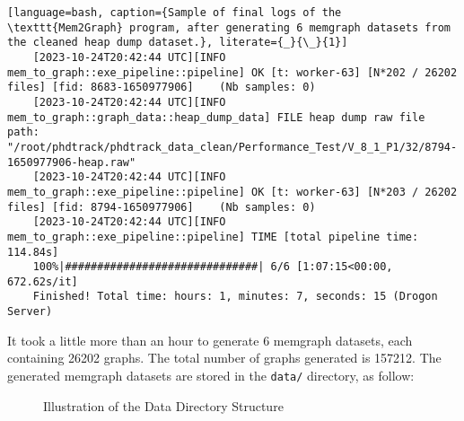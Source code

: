 \begin{lstlisting}[language=bash, caption={Sample of final logs of the \texttt{Mem2Graph} program, after generating 6 memgraph datasets from the cleaned heap dump dataset.}, literate={_}{\_}{1}]
    [2023-10-24T20:42:44 UTC][INFO mem_to_graph::exe_pipeline::pipeline] OK [t: worker-63] [N*202 / 26202 files] [fid: 8683-1650977906]    (Nb samples: 0)
    [2023-10-24T20:42:44 UTC][INFO mem_to_graph::graph_data::heap_dump_data] FILE heap dump raw file path: "/root/phdtrack/phdtrack_data_clean/Performance_Test/V_8_1_P1/32/8794-1650977906-heap.raw"
    [2023-10-24T20:42:44 UTC][INFO mem_to_graph::exe_pipeline::pipeline] OK [t: worker-63] [N*203 / 26202 files] [fid: 8794-1650977906]    (Nb samples: 0)
    [2023-10-24T20:42:44 UTC][INFO mem_to_graph::exe_pipeline::pipeline] TIME [total pipeline time: 114.84s]
    100%|##############################| 6/6 [1:07:15<00:00, 672.62s/it]
    Finished! Total time: hours: 1, minutes: 7, seconds: 15 (Drogon Server)
\end{lstlisting}

It took a little more than an hour to generate 6 memgraph datasets, each containing 26202 graphs. The total number of graphs generated is 157212. The generated memgraph datasets are stored in the \texttt{data/} directory, as follow:

\begin{figure}[H]
    \centering
    \caption{Illustration of the Data Directory Structure}
    \label{fig:data_structure}
    \begin{minipage}{0.8\textwidth}
    \end{minipage}
\end{figure}

